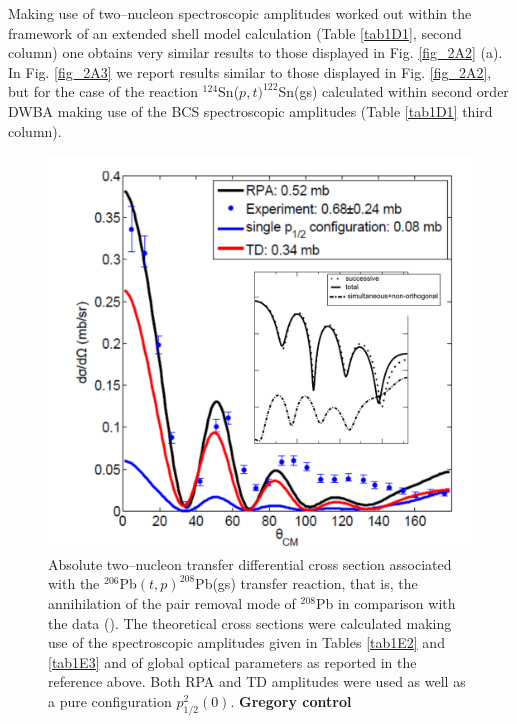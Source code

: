  Making use of two--nucleon spectroscopic amplitudes worked out within the framework of an extended shell model calculation (Table \ref{tab1D1}, second column) one obtains very similar results to those displayed in Fig. \ref{fig_2A2} (a). In Fig. \ref{fig_2A3} we report results similar to those displayed in Fig. \ref{fig_2A2}, but for the case of the reaction $^{124}$Sn($p,t)^{122}$Sn(gs) calculated within second order DWBA making use of the BCS spectroscopic amplitudes (Table \ref{tab1D1} third column). 


    \begin{figure}
    \centerline{\includegraphics*[width=\textwidth,angle=0]{nutshell/figs/tp_Pb_contributions.pdf}}
    \caption{Absolute two--nucleon transfer differential cross section associated with the $^{206}$Pb$(t,p)^{208}$Pb(gs) transfer reaction, that is, the annihilation of the pair removal mode of $^{208}$Pb in comparison with the data (\cite{Bjerregaard:66b}). The theoretical cross sections were calculated making use of the spectroscopic amplitudes given in Tables \ref{tab1E2} and \ref{tab1E3} and of global optical parameters as reported in the reference above. Both  RPA and TD amplitudes were used as well as a pure configuration $p_{1/2}^2(0)$. \textbf{Gregory control}}\label{fig2A4}
    \end{figure}

